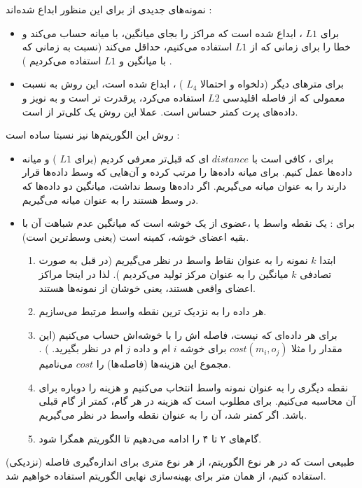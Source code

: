\documentclass[a4paper, 12pt]{article}
\begin{document}
	
	نمونه‌های جدیدی از 
	برای این منظور ابداع شده‌اند :
	\begin{itemize}
		\item 
		 برای 
		$L1$
		،
		ابداع شده است که مراکز را بجای میانگین، با میانه حساب می‌کند و خطا را برای زمانی که از 
		$L1$
		استفاده می‌کنیم، حداقل می‌کند (نسبت به زمانی که با میانگین و $L1$
		استفاده می‌کردیم
		) 
		.
		\item
		برای متر‌های دیگر (دلخواه و احتمالا 
		$L_4$
		)
		،
		ابداع شده است، این روش به نسبت 
		معمولی که از فاصله اقلیدسی 
		$L2$
		استفاده می‌کرد، پرقدرت تر است و به نویز و داده‌های پرت کمتر حساس است. عملا این روش یک کلی‌تر از 
		است.
	\end{itemize}
	روش این الگوریتم‌ها نیز نسبتا ساده است : 
	\begin{itemize}
		\item 
		برای 
		، کافی است با 
		$distance$
		ای که قبل‌تر معرفی کردیم (برای 
		$L1$
		)
		و میانه داده‌ها عمل کنیم. برای میانه داده‌ها را مرتب کرده و آن‌هایی که وسط داده‌ها قرار دارند را به عنوان میانه می‌گیریم. اگر داده‌ها وسط نداشت، میانگین دو داده‌ها که در وسط هستند را به عنوان میانه می‌گیریم. 
		
		\item
		برای 
		: 
		یک نقطه واسط یا 
	 	،عضوی از یک خوشه است که میانگین عدم شباهت آن با بقیه اعضای خوشه، کمینه است (یعنی وسط‌ترین است). 
	 	  
		\begin{enumerate}
			\item 
			ابتدا 
			$k$
			نمونه را به عنوان نقاط واسط در نظر می‌گیریم (در قبل به صورت تصادفی 
			$k$
			میانگین را به عنوان مرکز تولید می‌کردیم
			). 
			لذا در اینجا مراکز اعضای واقعی هستند، یعنی خوشان از نمونه‌ها هستند.
			
			\item
			هر داده را به نزدیک ترین نقطه واسط 
			مرتبط می‌سازیم.
			\item
			برای هر داده‌ای که 
			نیست، فاصله ‌اش را با 
			خوشه‌اش حساب می‌کنیم (این مقدار را مثلا 
			$cost(m_i,o_j)$
			برای خوشه 
			$i$
			ام و داده 
			$j$
			ام در نظر بگیرید.
			)
			. 
			مجموع این هزینه‌ها (فاصله‌ها) را 
			$cost$
			می‌نامیم. 
			\item 
			نقطه دیگری را به عنوان نمونه واسط انتخاب می‌کنیم و هزینه را دوباره برای آن محاسبه می‌کنیم. برای مطلوب است که هزینه در هر گام، کمتر از گام قبلی باشد. اگر کمتر شد، آن را به عنوان نقطه واسط در نظر می‌گیریم.
			\item
			گام‌های ۲ تا ۴ را ادامه می‌دهیم تا الگوریتم همگرا شود.
			
		\end{enumerate}
		
	\end{itemize}
	طبیعی است که در هر نوع الگوریتم، از هر نوع متری برای اندازه‌گیری فاصله (نزدیکی) استفاده کنیم، از همان متر برای بهینه‌سازی نهایی الگوریتم استفاده خواهیم شد.
	 
\end{document}
